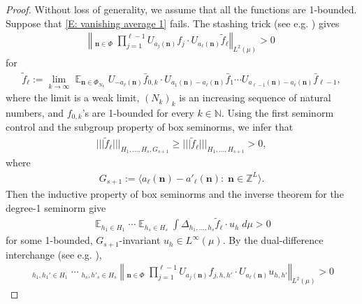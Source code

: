 \documentclass[11pt]{amsart}
\theoremstyle{definition}
\DeclareMathOperator*{\oE}{\overline{\mathbb{E}}}
\DeclareMathOperator*{\E}{\mathbb{E}}
\newcommand{\N}{{\mathbb N}}
\newcommand{\Z}{{\mathbb Z}}
\newcommand{\bn}{{\mathbf{n}}}
\newcommand{\norm}[1]{\left\Vert #1\right\Vert}
\newcommand{\nnorm}[1]{\lvert\!|\!| #1|\!|\!\rvert}
\newcommand{\1}{{\mathbf{1}}}
\begin{document}
\begin{proof}
Without loss of generality, we assume that all the functions are 1-bounded.
    Suppose that \eqref{E: vanishing average 1} fails. The stashing trick 
    (see e.g. \cite[Lemma~3.2]{FrKu22b}) gives
    \begin{align*}
        \norm{\oE_{\bn\in\Phi}\prod_{j=1}^{\ell-1} U_{a_j(\bn)}f_j\cdot U_{a_\ell(\bn)}\tilde f_\ell}_{L^2(\mu)} > 0
    \end{align*}
    for
    \begin{align*}
        \tilde f_\ell := \lim_{k\to\infty}\E_{\bn\in\Phi_{N_k}}U_{-a_\ell(\bn)}\bar f_{0,k}\cdot U_{a_1(\bn)-a_\ell(\bn)}\bar f_1\cdots U_{a_{\ell-1}(\bn)-a_\ell(\bn)}\bar f_{\ell-1}, 
    \end{align*}
    where the limit is a weak limit, $(N_k)_k$ is an increasing sequence of natural numbers, and $f_{0,k}$'s are 1-bounded for every $k\in\N$.
    Using the first seminorm control and the subgroup property of box seminorms, we infer that %
    \begin{align*}
        \nnorm{\tilde f_\ell}_{H_1, \ldots, H_s, G_{s+1}}\geq \nnorm{\tilde f_\ell}_{H_1, \ldots, H_{s+1}}>0,
    \end{align*}
    where
    \begin{align*}
        G_{s+1}:=\langle a_\ell(\bn)-a'_\ell(\bn)\colon\; \bn\in\Z^L\rangle.
    \end{align*}
    Then the inductive property of box seminorms and the inverse theorem for the degree-1 seminorm give
    \begin{align*}
        \E_{h_1\in H_1}\cdots \E_{h_s\in H_s}\int \Delta_{h_1,\ldots, h_s}\tilde f_\ell \cdot u_h\; d\mu >0
    \end{align*}
    for some 1-bounded, $G_{s+1}$-invariant $u_h\in L^\infty(\mu)$. By the dual-difference interchange (see e.g. \cite[Proposition~3.3]{FrKu22b}),
    \begin{align*}
        \oE_{h_1,h_1'\in H_1} \cdots \oE_{h_s,h'_s\in H_{s}}\norm{\oE_{\bn\in\Phi}\prod_{j=1}^{\ell-1} U_{a_j(\bn)}f_{j,h,h'}\cdot U_{a_\ell(\bn)}u_{h,h'}}_{L^2(\mu)} > 0

\end{align*}
\end{proof}
\end{document}
